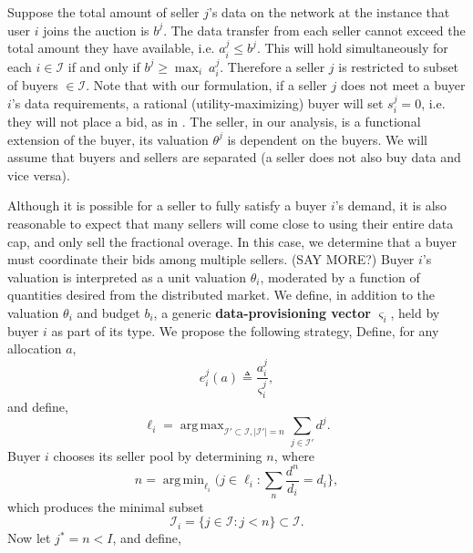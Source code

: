\documentclass[12pt]{article}
\theoremstyle{definition}
\newcommand{\vs}{\varsigma}
\newcommand{\mcI}{\mathcal{I}}
\DeclareMathOperator*{\argmax}{arg\,max}
\DeclareMathOperator*{\argmin}{arg\,min}
\begin{document}
\begin{multicols}{2}
Suppose the total amount of seller $j$'s data on the network at the instance that
user $i$ joins the auction is $b^j$. 
The data transfer from each seller cannot exceed the total amount they have available,
i.e. $a_i^j \le b^j$. This will hold simultaneously for each $i \in
\mcI$ if and only if $b^j \ge \max_i \ a_i^j$. Therefore a seller $j$ is
restricted to subset of buyers $\in\mcI$.
Note that with our formulation, if a seller $j$ does not meet a buyer $i$'s data requirements, a
rational (utility-maximizing) buyer will set $s_i^j = 0$, i.e. they will not
place a bid, as in \cite{zheng}. The seller, in our analysis, is a functional
extension of the buyer, its valuation $\theta^j$ is dependent on the buyers. We will assume that buyers and sellers
are separated (a seller does not also buy data and vice versa).

Although it is possible for a seller to fully satisfy a buyer $i$'s demand, it
is also reasonable to expect that many sellers will come close to using their
entire data cap, and only sell the fractional overage. In this case, we
determine that a buyer must coordinate their bids among multiple sellers. (SAY
MORE?) Buyer $i$'s valuation is interpreted as a unit valuation $\theta_i$,
moderated
by a function of quantities desired from the distributed market. 
We define, in addition to the valuation $\theta_i$ and budget $b_i$, a generic
\textbf{data-provisioning vector} $\vs_i$, held by buyer $i$ as part of its type. We propose the
following strategy,
{
\label{buyerstrategy}
Define, for any allocation $a$,
\begin{equation}\label{opt-out}
    e_i^j(a) \triangleq \frac{a_i^j}{\vs_i^j},
\end{equation}
and define,
$$
    \ell_i =\argmax_{\mcI' \subset \mcI, \vert\mcI'\vert =
n}\sum_{j\in\mcI'} d^j.
$$
Buyer $i$ chooses its seller pool by determining $n$, where
\begin{equation}\label{buyercoordinate}
    n = \argmin_{\ell_i}(j \in \ell_i : \displaystyle\sum_{n} \frac{d^n}{d_i} = d_i\rbrace,
\end{equation} 
which produces the minimal subset 
\begin{equation}\label{sellers}
    \mcI_i = \lbrace j \in \mcI : j < n\rbrace \subset \mcI.
\end{equation} 
Now let $j^* = n < I$, and define, 
\begin{equation}\label{opt-quantity}

\end{equation}}
\end{multicols}
\end{document}
